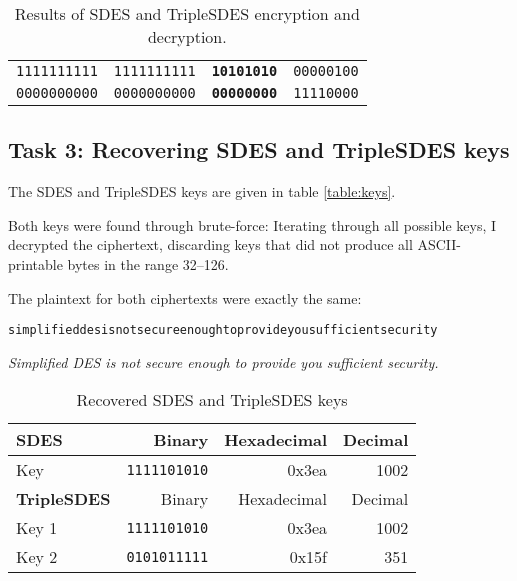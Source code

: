 \documentclass[a4paper,english,12pt]{article}
\begin{document}
\begin{table}
\begin{tabular}{@{}llll@{}}
            \texttt{1111111111} &
            \texttt{1111111111} &
      \texttt{\textbf{10101010}} &
              \texttt{00000100} \\

            \texttt{0000000000} &
            \texttt{0000000000} &
      \texttt{\textbf{00000000}} &
              \texttt{11110000} \\
    \bottomrule
  \end{tabular}
  \caption{Results of SDES and TripleSDES encryption and decryption.}
  \label{table:sdes}
\end{table}

\subsection{Task 3: Recovering SDES and TripleSDES keys}

The SDES and TripleSDES keys are given in table \vref{table:keys}.

Both keys were found through brute-force: Iterating through all possible keys,
I decrypted the ciphertext, discarding keys that did not produce all
ASCII-printable bytes in the range 32--126.

The plaintext for both ciphertexts were exactly the same:

\begin{verbatim}
simplifieddesisnotsecureenoughtoprovideyousufficientsecurity
\end{verbatim}

\begin{center}
\textit{Simplified DES is not secure enough to provide you sufficient security.}
\end{center}

\begin{table}
  \centering
  \begin{tabular}{@{}lrrr@{}}
    \toprule
    \textbf{SDES} & Binary & Hexadecimal & Decimal \\
    \midrule
    Key & \texttt{1111101010} & 0x3ea & 1002 \\

    \toprule
    \textbf{TripleSDES} & Binary & Hexadecimal & Decimal \\
    \midrule
    Key 1 & \texttt{1111101010} & 0x3ea & 1002 \\
    Key 2 & \texttt{0101011111} & 0x15f &  351 \\
    \bottomrule
  \end{tabular}
  \caption{Recovered SDES and TripleSDES keys}
  \label{table:keys}
\end{table}
\end{document}
